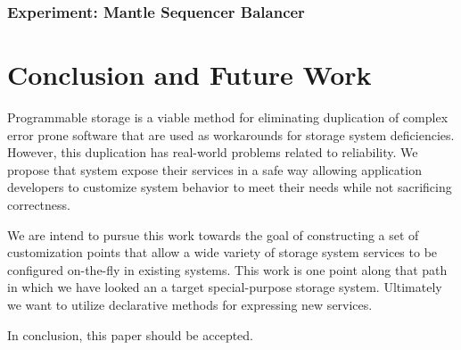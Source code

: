 \documentclass[10pt,twocolumn]{article}
\begin{document}
\subsubsection{Experiment: Mantle Sequencer
Balancer}\label{experiment-mantle-sequencer-balancer}

\section{Conclusion and Future Work}\label{conclusion-and-future-work}

Programmable storage is a viable method for eliminating duplication of
complex error prone software that are used as workarounds for storage
system deficiencies. However, this duplication has real-world problems
related to reliability. We propose that system expose their services in
a safe way allowing application developers to customize system behavior
to meet their needs while not sacrificing correctness.

We are intend to pursue this work towards the goal of constructing a set
of customization points that allow a wide variety of storage system
services to be configured on-the-fly in existing systems. This work is
one point along that path in which we have looked an a target
special-purpose storage system. Ultimately we want to utilize
declarative methods for expressing new services.

In conclusion, this paper should be accepted.



\end{document}
